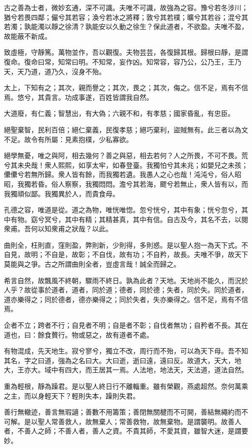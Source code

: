 \begin{pinyinscope}
古之善為士者，微妙玄通，深不可識。夫唯不可識，故強為之容。豫兮若冬涉川；猶兮若畏四鄰；儼兮其若容；渙兮若冰之將釋；敦兮其若樸；曠兮其若谷；混兮其若濁；孰能濁以靜之徐清？孰能安以久動之徐生？保此道者，不欲盈。夫唯不盈，故能蔽不新成。

致虛極，守靜篤。萬物並作，吾以觀復。夫物芸芸，各復歸其根。歸根曰靜，是謂復命。復命曰常，知常曰明。不知常，妄作凶。知常容，容乃公，公乃王，王乃天，天乃道，道乃久，沒身不殆。

太上，下知有之；其次，親而譽之；其次，畏之；其次，侮之。信不足，焉有不信焉。悠兮，其貴言。功成事遂，百姓皆謂我自然。

大道廢，有仁義；智慧出，有大偽；六親不和，有孝慈；國家昏亂，有忠臣。

絕聖棄智，民利百倍；絕仁棄義，民復孝慈；絕巧棄利，盜賊無有。此三者以為文不足。故令有所屬：見素抱樸，少私寡欲。

絕學無憂，唯之與阿，相去幾何？善之與惡，相去若何？人之所畏，不可不畏。荒兮其未央哉！衆人熙熙，如享太牢，如春登臺。我獨怕兮其未兆；如嬰兒之未孩；儽儽兮若無所歸。衆人皆有餘，而我獨若遺。我愚人之心也哉！沌沌兮，俗人昭昭，我獨若昏。俗人察察，我獨悶悶。澹兮其若海，飂兮若無止，衆人皆有以，而我獨頑似鄙。我獨異於人，而貴食母。

孔德之容，唯道是從。道之為物，唯恍唯惚。忽兮恍兮，其中有象；恍兮忽兮，其中有物。窈兮冥兮，其中有精；其精甚真，其中有信。自古及今，其名不去，以閱衆甫。吾何以知衆甫之狀哉？以此。

曲則全，枉則直，窪則盈，弊則新，少則得，多則惑。是以聖人抱一為天下式。不自見，故明；不自是，故彰；不自伐，故有功；不自矜，故長。夫唯不爭，故天下莫能與之爭。古之所謂曲則全者，豈虛言哉！誠全而歸之。

希言自然，故飄風不終朝，驟雨不終日。孰為此者？天地。天地尚不能久，而況於人乎？故從事於道者，道者，同於道；德者，同於德；失者，同於失。同於道者，道亦樂得之；同於德者，德亦樂得之；同於失者，失亦樂得之。信不足，焉有不信焉。

企者不立；跨者不行；自見者不明；自是者不彰；自伐者無功；自矜者不長。其在道也，曰：餘食贅行。物或惡之，故有道者不處。

有物混成，先天地生。寂兮寥兮，獨立不改，周行而不殆，可以為天下母。吾不知其名，字之曰道，強為之名曰大。大曰逝，逝曰遠，遠曰反。故道大，天大，地大，王亦大。域中有四大，而王居其一焉。人法地，地法天，天法道，道法自然。

重為輕根，靜為躁君。是以聖人終日行不離輜重。雖有榮觀，燕處超然。奈何萬乘之主，而以身輕天下？輕則失本，躁則失君。

善行無轍迹，善言無瑕讁；善數不用籌策；善閉無關楗而不可開，善結無繩約而不可解。是以聖人常善救人，故無棄人；常善救物，故無棄物。是謂襲明。故善人者，不善人之師；不善人者，善人之資。不貴其師，不愛其資，雖智大迷，是謂要妙。


\end{pinyinscope}
